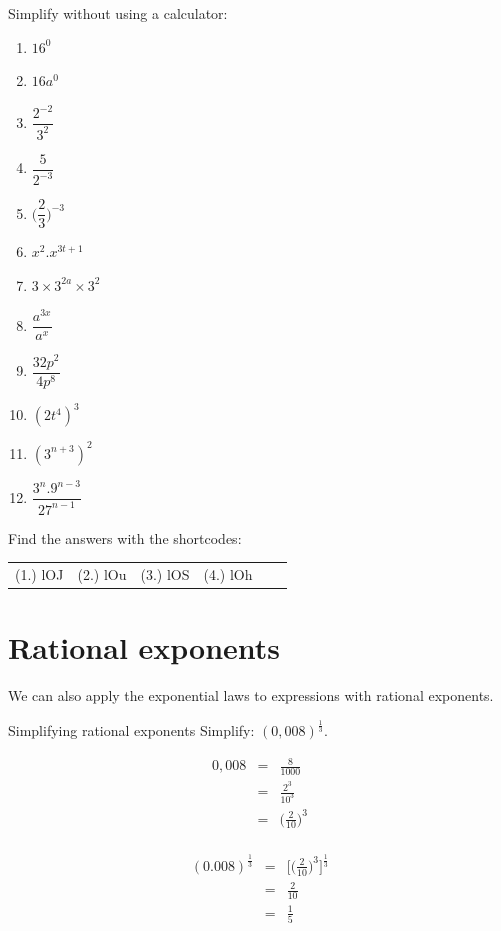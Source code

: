 \begin{exercises}{}{
Simplify without using a calculator:
\begin{multicols}{2}
\begin{enumerate}[label=\textbf{\arabic*}., itemsep=5pt]
 \item $16^0$
 \item $16a^0$
 \item $\dfrac{2^{-2}}{3^2}$
 \item $ \dfrac{5}{2^{-3}}$
 \item $ \Big(\dfrac{2}{3}\Big)^{-3} $
 \item $ x^2 . x^{3t+1} $
 \item $ 3 \times 3^{2a} \times 3^2$
 \item $ \dfrac{a^{3x}}{a^x} $
 \item $ \dfrac{32p^2}{4p^8}$
 \item $ (2t^4)^3$
 \item $ (3^{n+3})^2$
 \item $ \dfrac{3^n . 9^{n-3}}{27^{n-1}}$
\end{enumerate}
\end{multicols}
\practiceinfo
{} Find the answers with the shortcodes:
\begin{tabular}[h]{cccccc}
(1.) lOJ  &  (2.) lOu  &  (3.) lOS  &  (4.) lOh  & 
\end{tabular}
}
\end{exercises}

\section{Rational exponents}

We can also apply the exponential laws to expressions with rational exponents.
\begin{wex}
{%
Simplifying rational exponents
} 
{%
Simplify: 
$ (0,008)^{\frac{1}{3}}.$
}
{%

\begin{eqnarray*}
 0,008 & = & \frac{8}{1000} \\
       & = & \frac{2^3}{10^3} \\
       & = & \Big(\frac{2}{10}\Big)^3\\
\end{eqnarray*}

\begin{eqnarray*}
 (0.008)^{\frac{1}{3}} & = & \Big[\Big(\frac{2}{10}\Big)^3\Big]^{\frac{1}{3}} \\
		 & = & \frac{2}{10} \\
		 & = & \frac{1}{5}
\end{eqnarray*}
}
\end{wex}

